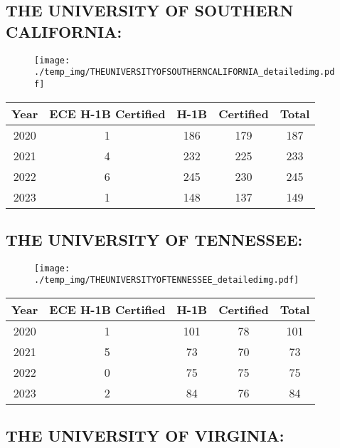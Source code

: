 \documentclass{article}%
\begin{document}
%
\newpage%
\subsection{THE UNIVERSITY OF SOUTHERN CALIFORNIA:}%
\label{subsec:THEUNIVERSITYOFSOUTHERNCALIFORNIA}%
\label{THEUNIVERSITYOFSOUTHERNCALIFORNIAdetailed}%


\begin{figure}[htbp]%
\centering%
\texttt{[image: ./temp\_img/THEUNIVERSITYOFSOUTHERNCALIFORNIA\_detailedimg.pdf]}%
\end{figure}

%
\begin{longtable}{c|c|c|c|c}%
\hline%
Year&ECE H{-}1B Certified&H{-}1B&Certified&Total\\%
\hline%
2020&1&186&179&187\\%
\hline%
2021&4&232&225&233\\%
\hline%
2022&6&245&230&245\\%
\hline%
2023&1&148&137&149\\%
\hline%
\end{longtable}

%
\newpage%
\subsection{THE UNIVERSITY OF TENNESSEE:}%
\label{subsec:THEUNIVERSITYOFTENNESSEE}%
\label{THEUNIVERSITYOFTENNESSEEdetailed}%


\begin{figure}[htbp]%
\centering%
\texttt{[image: ./temp\_img/THEUNIVERSITYOFTENNESSEE\_detailedimg.pdf]}%
\end{figure}

%
\begin{longtable}{c|c|c|c|c}%
\hline%
Year&ECE H{-}1B Certified&H{-}1B&Certified&Total\\%
\hline%
2020&1&101&78&101\\%
\hline%
2021&5&73&70&73\\%
\hline%
2022&0&75&75&75\\%
\hline%
2023&2&84&76&84\\%
\hline%
\end{longtable}

%
\newpage%
\subsection{THE UNIVERSITY OF VIRGINIA:}%
\label{subsec:THEUNIVERSITYOFVIRGINIA}%
\label{THEUNIVERSITYOFVIRGINIAdetailed}%
\end{document}
